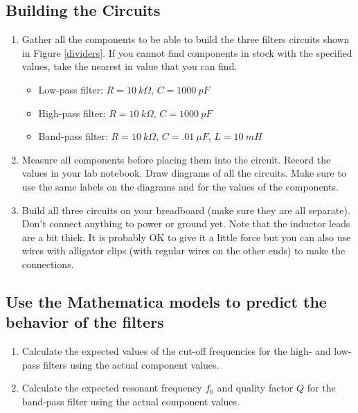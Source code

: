 \documentclass[10pt]{PhysLab1C} %
\begin{document}
\subsection{Building the Circuits}


\begin{enumerate}
\def\labelenumi{\arabic{enumi}.}
\item
  Gather all the components to be able to build the three filters
  circuits shown in Figure \ref{dividers}. If you cannot find components in stock with
  the specified values, take the nearest in value that you can find.

  \begin{itemize}
  \item
    Low-pass filter: $R = 10~k\Omega$, $C = 1000~pF$
  \item
    High-pass filter: $R = 10~k\Omega$, $C = 1000~pF$
  \item
    Band-pass filter: $R = 10~k\Omega$, $C = .01~\mu F$, $L = 10~mH$
  \end{itemize}
\item
  Measure all components before placing them into the circuit. Record
  the values in your lab notebook. Draw diagrams of all the circuits.
  Make sure to use the same labels on the diagrams and for the values of
  the components.
\item
  Build all three circuits on your breadboard (make sure they are all
  separate). Don't connect anything to power or ground yet. Note that
  the inductor leads are a bit thick. It is probably OK to give it a
  little force but you can also use wires with alligator clips (with
  regular wires on the other ends) to make the connections.
\end{enumerate}

\subsection{Use the Mathematica models to predict the behavior of the filters}


\begin{enumerate}
\def\labelenumi{\arabic{enumi}.}
\item
  Calculate the expected values of the cut-off frequencies for the high-
  and low-pass filters using the actual component values.
\item
  Calculate the expected resonant frequency \(f_0\) and quality factor
  \(Q\) for the band-pass filter using the actual component values.
\end{enumerate}
\end{document}
